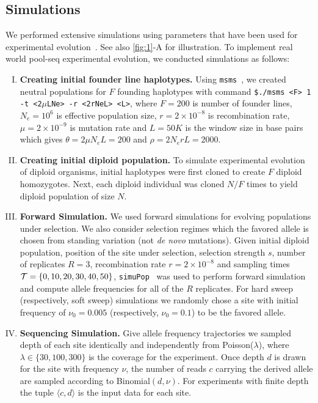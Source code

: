 		


\subsection{Simulations}
We performed extensive simulations using parameters that have been
used for \dmel experimental
evolution~\cite{kofler2013guide}. See also \ref{fig:1}-A 
for
illustration. To implement real world pool-seq experimental evolution, we 
conducted simulations as follows:
\begin{enumerate}[I.]
\item {\bf Creating initial founder line haplotypes.} Using
  \texttt{msms}~\cite{ewing2010msms}, we created neutral populations for $F$
  founding haplotypes with command \texttt{\$./msms
    <F> 1 -t <2$\mu$LNe> -r <2rNeL> <L>}, where $F=200$ is number of
  founder lines, $N_e=10^6$ is effective population size,
  $r=2\times10^{-8}$ is recombination rate, $\mu=2\times 10^{-9}$ is
  mutation rate and $L=50K$ is the window size in base pairs which
  gives $\theta=2\mu N_eL=200$ and $\rho=2N_erL=2000$.
  
\item{\bf Creating initial diploid population.} To simulate
  experimental evolution of diploid organisms, initial haplotypes were
  first cloned to create $F$ diploid homozygotes. Next, each diploid
  individual was cloned $N/F$ times to yield diploid population of
  size $N$.

\item{\bf Forward Simulation.} We used forward simulations for
  evolving populations under selection. We also consider selection
  regimes which the favored allele is chosen from standing
  variation (not \emph{de novo} mutations). Given initial diploid
  population, position of the site under selection, selection strength
  $s$, number of replicates $R=3$, recombination rate
  $r=2\times10^{-8}$ and sampling times ${\cal T}=\{0,10,20,30,40,50\}$,
  \texttt{simuPop}~\cite{peng2005simupop} was used to perform forward
  simulation and compute allele frequencies for all of the $R$
  replicates.  For hard sweep (respectively, soft sweep) simulations
  we randomly chose a site with initial frequency of $\nu_0=0.005$
  (respectively, $\nu_0=0.1$) to be the favored allele.
\item{\bf Sequencing Simulation.} Give allele frequency trajectories
  we sampled depth of each site identically and independently from
  Poisson($\lambda$), where $\lambda \in \{30,100,300\}$ is the
  coverage for the experiment. Once depth $d$ is drawn for the site
  with frequency $\nu$, the number of reads $c$ carrying the derived
  allele are sampled according to Binomial$(d,\nu)$. For experiments
  with finite depth the tuple $\langle c,d\rangle$ is the input data
  for each site. 
\end{enumerate}

